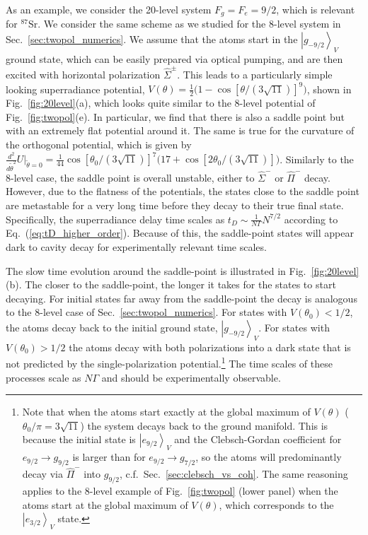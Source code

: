 \documentclass[aps,prx,superscriptaddress,twocolumn,notitlepage,nofootinbib,longbibliography]{revtex4-2}
\newcommand{\ket}[1]{\left|#1\right>}
\begin{document}
As an example, we consider the 20-level system $F_g=F_e=9/2$, which is relevant for $^{87}\mathrm{Sr}$. 
We consider the same scheme as we studied for the 8-level system in Sec.~\ref{sec:twopol_numerics}. We assume that the atoms start in the $\ket{g_{-9/2}}_V$ ground state, which can be easily prepared via optical pumping, and are then excited with horizontal polarization $\hat{\Sigma}^\pm$.
This leads to a particularly simple looking superradiance potential,
$V(\theta)=\frac{1}{2} \big(1 - \cos[\theta/(3 \sqrt{11})]^9\big)$, shown in Fig.~\ref{fig:20level}(a), which looks quite similar to the 8-level potential of Fig.~\ref{fig:twopol}(e).
In particular, we find that there is also a saddle point but with an extremely flat potential around it. The same is true for the curvature of the orthogonal potential, which is given by $\frac{d^2}{d\tilde\theta^2}U\big|_{\tilde\theta=0} = \frac{1}{44} \cos[\theta_0/(3\sqrt{11})]^7 \big(17 + \cos[2\theta_0/(3\sqrt{11})] \big)$. Similarly to the 8-level case, the saddle point is overall unstable, either to $\hat{\Sigma}^-$ or $\hat{\Pi}^-$ decay. However, due to the flatness of the potentials, the states close to the saddle point are metastable for a very long time before they decay to their true final state.
Specifically, the superradiance delay time scales as $t_D\sim \frac{1}{N\Gamma} N^{7/2}$ according to Eq.~(\ref{eq:tD_higher_order}).
Because of this, the saddle-point states will appear dark to cavity decay for experimentally relevant time scales.

The slow time evolution around the saddle-point is illustrated in Fig.~\ref{fig:20level}(b). The closer to the saddle-point, the longer it takes for the states to start decaying.
For initial states far away from the saddle-point the decay is analogous to the 8-level case of Sec.~\ref{sec:twopol_numerics}. For states with $V(\theta_0)<1/2$, the atoms decay back to the initial ground state, $\ket{g_{-9/2}}_V$. For states with $V(\theta_0)>1/2$ the atoms decay with both polarizations into a dark state that is not predicted by the single-polarization potential.\footnote{Note that when the atoms start exactly at the global maximum of $V(\theta)$ ($\theta_0/\pi=3\sqrt{11}$) the system decays back to the ground manifold. This is because the initial state is $\ket{e_{9/2}}_V$ and the Clebsch-Gordan coefficient for $e_{9/2}\rightarrow g_{9/2}$ is larger than for $e_{9/2}\rightarrow g_{7/2}$, so the atoms will predominantly decay via $\hat{\Pi}^-$ into $g_{9/2}$, c.f.~Sec.~\ref{sec:clebsch_vs_coh}. The same reasoning applies to the 8-level example of Fig.~\ref{fig:twopol} (lower panel) when the atoms start at the global maximum of $V(\theta)$, which corresponds to the $\ket{e_{3/2}}_V$ state.} The time scales of these processes scale as $N\Gamma$ and should be experimentally observable.
\end{document}
